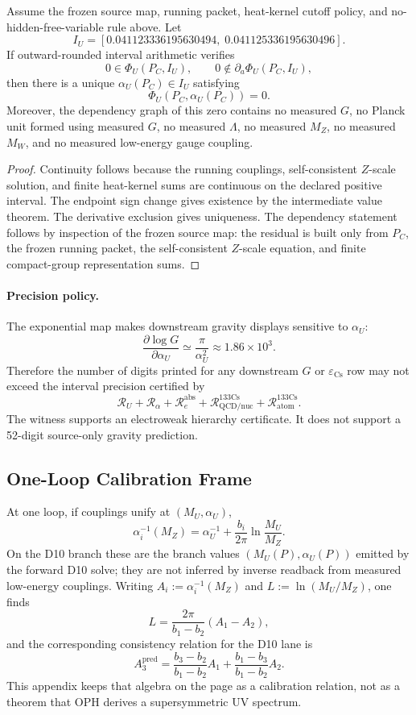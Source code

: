 \begin{theorem}\label{thm:particle-ru-witness}
Assume the frozen source map, running packet, heat-kernel cutoff policy, and
no-hidden-free-variable rule above. Let
\[
I_U=[0.041123336195630494,\;0.041125336195630496].
\]
If outward-rounded interval arithmetic verifies
\[
0\in \Phi_U(P_C,I_U),
\qquad
0\notin \partial_a\Phi_U(P_C,I_U),
\]
then there is a unique \(\alpha_U(P_C)\in I_U\) satisfying
\[
\Phi_U(P_C,\alpha_U(P_C))=0.
\]
Moreover, the dependency graph of this zero contains no measured \(G\), no Planck unit formed
using measured \(G\), no measured \(\Lambda\), no measured \(M_Z\), no measured \(M_W\), and no
measured low-energy gauge coupling.
\end{theorem}

\begin{proof}
Continuity follows because the running couplings, self-consistent \(Z\)-scale solution, and
finite heat-kernel sums are continuous on the declared positive interval. The endpoint sign
change gives existence by the intermediate value theorem. The derivative exclusion gives
uniqueness. The dependency statement follows by inspection of the frozen source map: the residual
is built only from \(P_C\), the frozen running packet, the self-consistent \(Z\)-scale equation,
and finite compact-group representation sums.
\end{proof}

\paragraph{Precision policy.}
The exponential map makes downstream gravity displays sensitive to \(\alpha_U\):
\[
\frac{\partial\log G}{\partial \alpha_U}
\simeq
\frac{\pi}{\alpha_U^2}
\approx
1.86\times10^3.
\]
Therefore the number of digits printed for any downstream \(G\) or \(\varepsilon_{\mathrm{Cs}}\)
row may not exceed the interval precision certified by
\[
\mathcal R_U+\mathcal R_\alpha+\mathcal R_e^{\mathrm{abs}}
+\mathcal R_{\mathrm{QCD/nuc}}^{133\mathrm{Cs}}
+\mathcal R_{\mathrm{atom}}^{133\mathrm{Cs}}.
\]
The witness supports an electroweak hierarchy certificate. It does not support a 52-digit
source-only gravity prediction.

\subsection{One-Loop Calibration Frame}

At one loop, if couplings unify at \((M_U,\alpha_U)\),
\[
\alpha_i^{-1}(M_Z)=\alpha_U^{-1}+\frac{b_i}{2\pi}\ln\frac{M_U}{M_Z}.
\]
On the D10 branch these are the branch values \((M_U(P),\alpha_U(P))\) emitted by the forward
D10 solve; they are not inferred by inverse readback from measured low-energy couplings.
Writing \(A_i:=\alpha_i^{-1}(M_Z)\) and \(L:=\ln(M_U/M_Z)\), one finds
\[
L=\frac{2\pi}{b_1-b_2}(A_1-A_2),
\]
and the corresponding consistency relation for the D10 lane is
\[
A_3^{\mathrm{pred}}
=
\frac{b_3-b_2}{b_1-b_2}A_1
+
\frac{b_1-b_3}{b_1-b_2}A_2.
\]
This appendix keeps that algebra on the page as a calibration relation, not as a theorem that OPH
derives a supersymmetric UV spectrum.

